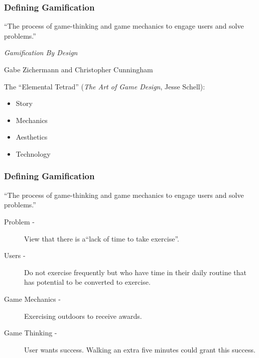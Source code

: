 \documentclass{beamer}
\begin{document}
\begin{frame}
  \frametitle{Defining Gamification}
  ``The process of game-thinking and game mechanics to engage users
  and solve problems.''

  \hfill \emph{Gamification By Design}
  
  \hfill Gabe Zichermann and Christopher Cunningham
  
  \vspace{20pt}
  
  The ``Elemental Tetrad'' (\emph{The Art of Game Design}, Jesse Schell):
  \begin{itemize}
    \item Story
    \item Mechanics
    \item Aesthetics
    \item Technology
  \end{itemize}
\end{frame}

\begin{frame}
  \frametitle{Defining Gamification}
  ``The process of game-thinking and game mechanics to engage users
  and solve problems.''

  \begin{description}
    \item[Problem -] View that there is a``lack of time to take exercise''.
    \item[Users -] Do not exercise frequently but who have time in
      their daily routine that has potential to be converted to
      exercise. 
    \item[Game Mechanics -] Exercising outdoors to receive awards.
    \item[Game Thinking -] User wants success. Walking an extra five
      minutes could grant this success.
  \end{description}
\end{frame}
\end{document}
